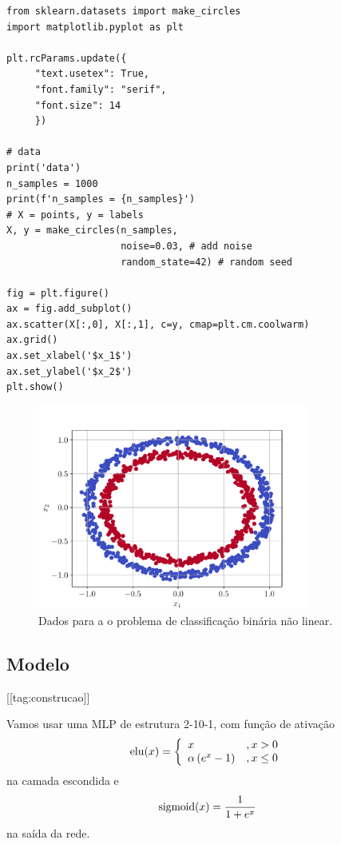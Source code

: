\begin{lstlisting}
from sklearn.datasets import make_circles
import matplotlib.pyplot as plt

plt.rcParams.update({
     "text.usetex": True,
     "font.family": "serif",
     "font.size": 14
     })

# data
print('data')
n_samples = 1000
print(f'n_samples = {n_samples}')
# X = points, y = labels
X, y = make_circles(n_samples,
                    noise=0.03, # add noise
                    random_state=42) # random seed

fig = plt.figure()
ax = fig.add_subplot()
ax.scatter(X[:,0], X[:,1], c=y, cmap=plt.cm.coolwarm)
ax.grid()
ax.set_xlabel('$x_1$')
ax.set_ylabel('$x_2$')
plt.show()
\end{lstlisting}

\begin{figure}[H]
  \centering
  \includegraphics[width=0.8\textwidth]{./cap_mlp/dados/fig_classbin/fig}
  \caption{Dados para a o problema de classificação binária não linear.}
  \label{cap_mlp_sec_classbin:fig:dados}
\end{figure}

\subsection{Modelo}
[[tag:construcao]]

Vamos usar uma MLP de estrutura 2-10-1, com função de ativação
\begin{equation}
  \operatorname{elu}(x) = \left\{
    \begin{array}{ll}
      x &, x > 0\\
      \alpha\left(e^x - 1\right) &, x \leq 0
    \end{array}
\right.
\end{equation}
na camada escondida e
\begin{equation}
  \operatorname{sigmoid}(x) = \frac{1}{1 + e^x}
\end{equation}
na saída da rede.

